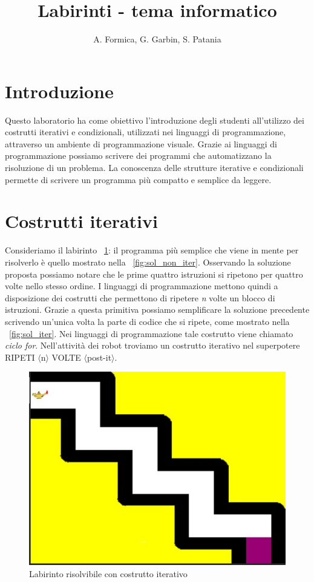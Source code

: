 \documentclass[12pt]{article}
\title{Labirinti - tema informatico}
\author{A. Formica, G. Garbin, S. Patania}
\begin{document}
\maketitle
%
% 
\section{Introduzione}
Questo laboratorio ha come obiettivo l'introduzione degli studenti all'utilizzo dei costrutti iterativi e condizionali, utilizzati nei linguaggi di programmazione, attraverso un ambiente di programmazione visuale. Grazie ai linguaggi di programmazione possiamo scrivere dei programmi che automatizzano la risoluzione di un problema. La conoscenza delle strutture iterative e condizionali permette di scrivere un programma più compatto e semplice da leggere.
%
%
\section{Costrutti iterativi}
Consideriamo il labirinto \figurename~\ref{fig:maze_iter}: il programma più semplice che viene in mente per risolverlo è quello mostrato nella \figurename~\ref{fig:sol_non_iter}. Osservando la soluzione proposta possiamo notare che le prime quattro istruzioni si ripetono per quattro volte nello stesso ordine. I linguaggi di programmazione mettono quindi a disposizione dei costrutti che permettono di ripetere \textit{n} volte un blocco di istruzioni. Grazie a questa primitiva possiamo semplificare la soluzione precedente scrivendo un'unica volta la parte di codice che si ripete, come mostrato nella \figurename~\ref{fig:sol_iter}. Nei linguaggi di programmazione tale costrutto viene chiamato \textit{ciclo for}. Nell'attività dei robot troviamo un costrutto iterativo nel superpotere RIPETI $\langle$n$\rangle$ VOLTE $\langle$post-it$\rangle$.
 
\begin{figure}
\centering
\includegraphics[scale=0.35]{img/maze3.jpg}
\caption{Labirinto risolvibile con costrutto iterativo}
\label{fig:maze_iter}
\end{figure}
\end{document}
